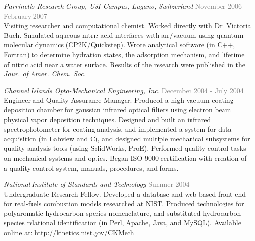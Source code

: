 \documentclass[margin,line]{res}
\begin{document}
\begin{resume}
\emph{Parrinello Research Group, USI-Campus, Lugano, Switzerland}  \hfill { \textcolor{gray}{November 2006 - February 2007}} \\
Visiting researcher and computational chemist. Worked directly with Dr. Victoria Buch. Simulated aqueous nitric acid interfaces with air/vacuum using quantum molecular dynamics (CP2K/Quickstep). Wrote analytical software (in C++, Fortran) to determine hydration states, the adsorption mechanism, and lifetime of nitric acid near a water surface. Results of the research were published in the \textit{Jour. of Amer. Chem. Soc.}


\emph{Channel Islands Opto-Mechanical Engineering, Inc.} \hfill {\textcolor{gray}{December 2004 - July 2004}} \\
Engineer and Quality Assurance Manager. Produced a high vacuum coating deposition chamber for gaussian infrared optical filters using electron beam physical vapor deposition techniques. Designed and built an infrared spectrophotometer for coating analysis, and implemented a system for data acquisition (in Labview and C), and designed multiple mechanical subsystems for quality analysis tools (using SolidWorks, ProE). Performed quality control tasks on mechanical systems and optics. Began ISO 9000 certification with creation of a quality control system, manuals, procedures, and forms. 

\emph{National Institute of Standards and Technology} \hfill {\textcolor{gray}{Summer 2004}} \\
Undergraduate Research Fellow. Developed a database and web-based front-end for real-fuels combustion models researched at NIST. Produced technologies for polyaromatic hydrocarbon species nomenclature, and substituted hydrocarbon species relational identification (in Perl, Apache, Java, and MySQL). Available online at: 
http://kinetics.nist.gov/CKMech



\end{resume}
\end{document}
